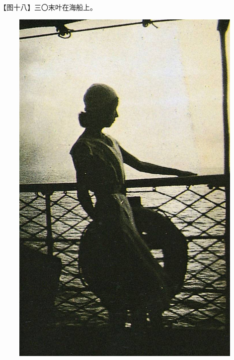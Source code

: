 \clearpage
\par 【图十八】三〇末叶在海船上。
\begin{figure}[htb]
    \centering %
    \includegraphics[scale=0.4]{picture/对照记18.jpeg}
\end{figure}

